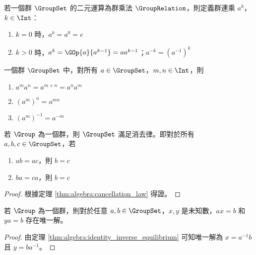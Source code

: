 \documentclass[12pt,a4paper,oneside]{report}
\begin{document}
\begin{CJK}{UTF8}{bkai}
\begin{mydef}[群連乘]
\label{def:group:group_multiplication}
若一個群 $\GroupSet$ 的二元運算為群乘法 $\GroupRelation$，則定義群連乘 $a^k$，$k\in{\Int}$：
\begin{enumerate}
\item $k=0$ 時，$a^k=a^0=e$
\item $k>0$ 時，$a^k=\GOp{a}{a^{k-1}}=aa^{k-1}$；$a^{-k}={(a^{-1})}^k$
\end{enumerate}
\end{mydef}

\begin{mycorol}[群連乘性質]
一個群 $\GroupSet$ 中，對所有 $a\in{\GroupSet}$，$m,n\in{\Int}$，則
\begin{enumerate}
\item ${a^m}{a^n}=a^{m+n}={a^n}{a^m}$
\item ${({a^m})}^n=a^{mn}$
\item ${({a^m})}^{-1}=a^{-m}$
\end{enumerate}
\end{mycorol}

\begin{mypropo}[群的消去律]
\label{pro:group:cancellation_law}
若 $\Group$ 為一個群，則 $\GroupSet$ 滿足消去律。即對於所有 $a,b,c\in{\GroupSet}$，若
\begin{enumerate}
\item $ab=ac$，則 $b=c$
\item $ba=ca$，則 $b=c$
\end{enumerate}
\end{mypropo}
\begin{proof}
根據定理 \ref{thm:algebra:cancellation_law} 得證。
\end{proof}

\begin{mythm}
\label{thm:group:equilibrium}
若 $\Group$ 為一個群，則對於任意 $a,b\in{\GroupSet}$，$x,y$ 是未知數，$ax=b$ 和 $ya=b$ 存在唯一解。
\end{mythm}
\begin{proof}
由定理 \ref{thm:algebra:identity_inverse_equilibrium} 可知唯一解為 $x=a^{-1}b$ 且 $y=ba^{-1}$。
\end{proof}


\end{CJK}
\end{document}
